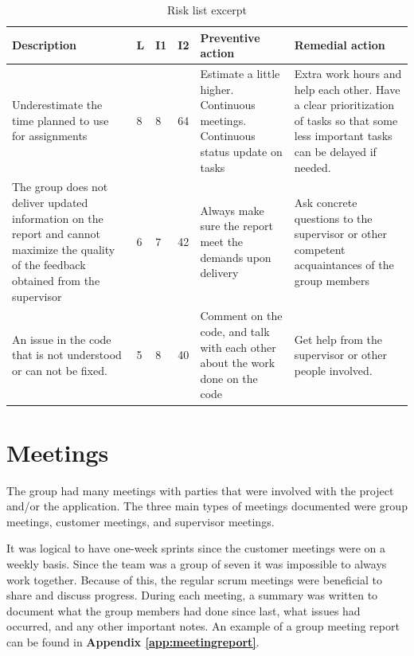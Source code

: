 \begin{table}[!h]
	\centering
	\caption{Risk list excerpt} 
	\label{Tab:riskexample}
	\begin{adjustbox}{center}
	 \begin{tabular}{| p{3.8cm} | p{1cm} | p{1cm} | p{1cm} | p{3.8cm} | p{3.8cm}|}

		\hline
		\textbf{Description} & \textbf{L} & \textbf{I1} & \textbf{I2} & \textbf{Preventive action} & \textbf{Remedial action} \\ \hline
		
		Underestimate the time planned to use for assignments & 8 & 8 & 64 & Estimate a little higher. Continuous meetings. Continuous status update on tasks & Extra work hours and help each other. Have a clear prioritization of tasks so that some less important tasks can be delayed if needed. \\ \hline
		
		The group does not deliver updated information on the report and cannot maximize the quality of the feedback obtained from the supervisor & 6 & 7 & 42 & Always make sure the report meet the demands upon delivery & Ask concrete questions to the supervisor or other competent acquaintances of the group members \\ \hline
		
		An issue in the code that is not understood or can not be fixed. & 5 & 8 & 40 & Comment on the code, and talk with each other about the work done on the code & Get help from the supervisor or other people involved. \\ \hline
	\end{tabular}
	\end{adjustbox}
\end{table}

\section{Meetings}
\label{sec:meetings}

The group had many meetings with parties that were involved with the project and/or the application. The three main types of meetings documented were group meetings, customer meetings, and supervisor meetings.\newline 

It was logical to have one-week sprints since the customer meetings were on a weekly basis. Since the team was a group of seven it was impossible to always work together. Because of this, the regular scrum meetings were beneficial to share and discuss progress. During each meeting, a summary was written to document what the group members had done since last, what issues had occurred, and any other important notes. An example of a group meeting report can be found in \textbf{Appendix \ref{app:meetingreport}}.\newline

